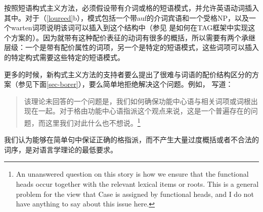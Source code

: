 \begin{exe}
\begin{xlist}[iv.]
\begin{exe}
\begin{xlist}[iv.]
按照短语构式主义方法，必须假设带有介词或格的短语模式，并允许英语动词插入其中。对于（\ref{loureed}b），模式包括一个带auf的介词宾语和一个受格NP，以及一个warten词项说明该词可以插入到这个结构中（参见 是如何在TAG框架中实现这个方案的）。因为就带有这种配价表征的动词有很多的概括，所以需要有两个承继层级：一个是带有配价属性的词项，另一个是特定的短语模式，这些词项可以插入的特定构式需要这些特定的短语模式。

更多的时候，新构式主义方法的支持者要么提出了很难与词语的配价结构区分的方案（参见下面\ref{sec-borer}），要么简单地拒绝解决这个问题。例如， \citet{Lohndal2012a}写道：
\begin{quotation}
该理论未回答的一个问题是，我们如何确保功能中心语与相关词项或词根出现在一起。对于格由功能中心语指派这个观点来说，这是一个普遍存在的问题，而这里我们对此什么也不想说。\citep{Lohndal2012a}\footnote{%
An unanswered question on this story is how we ensure that the functional heads occur together with
the relevant lexical items or roots. This is a general problem for the view that Case is assigned by
functional heads, and I do not have anything to say about this issue here.
}
\end{quotation}
我们认为能够在简单句中保证正确的格指派，而不产生大量过度概括或者不合法的词序，是对语言学理论的最低要求。


\end{xlist}
\end{exe}
\end{xlist}
\end{exe}
